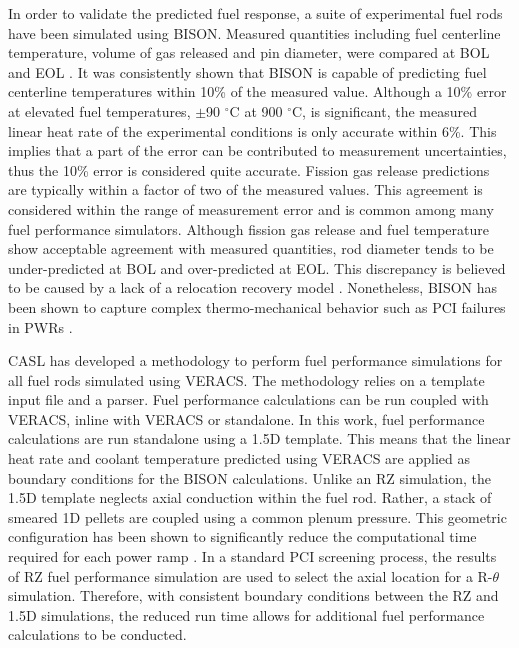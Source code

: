 \documentclass[edeposit,fullpage,11pt]{uiucthesis2009}
\begin{document}
In order to validate the predicted fuel response, a suite of experimental fuel rods have been simulated using BISON.
Measured quantities including fuel centerline temperature, volume of gas released and pin diameter, were compared at \gls{BOL} and \gls{EOL} \cite{williamson_validating_2016}.
It was consistently shown that BISON is capable of predicting fuel centerline temperatures within 10\% of the measured value.
Although a 10\% error at elevated fuel temperatures, $\pm$90 $^\circ$C at 900 $^\circ$C, is significant, the measured linear heat rate of the experimental conditions is only accurate within 6\%. 
This implies that a part of the error can be contributed to measurement uncertainties, thus the 10\% error is considered quite accurate.
Fission gas release predictions are typically within a factor of two of the measured values.
This agreement is considered within the range of measurement error and is common among many fuel performance simulators.
Although fission gas release and fuel temperature show acceptable agreement with measured quantities, rod diameter tends to be under-predicted at \gls{BOL} and over-predicted at \gls{EOL}.
This discrepancy is believed to be caused by a lack of a relocation recovery model \cite{williamson_validating_2016}.
Nonetheless, BISON has been shown to capture complex thermo-mechanical behavior such as PCI failures in PWRs \cite{montgomery_advanced_2014,capps_pci_2017}.

\gls{CASL} has developed a methodology to perform fuel performance simulations for all fuel rods simulated using \gls{VERACS}.
The methodology relies on a template input file and a parser.
Fuel performance calculations can be run coupled with \gls{VERACS}, inline with \gls{VERACS} or standalone.
In this work, fuel performance calculations are run standalone using a 1.5D template.
This means that the linear heat rate and coolant temperature predicted using \gls{VERACS} are applied as boundary conditions for the BISON calculations.
Unlike an RZ simulation, the 1.5D template neglects axial conduction within the fuel rod.
Rather, a stack of smeared 1D pellets are coupled using a common plenum pressure.  
This geometric configuration has been shown to significantly reduce the computational time required for each power ramp \cite{gardner_review_2017}.
In a standard \gls{PCI} screening process, the results of RZ fuel performance simulation are used to select the axial location for a R-$\theta$ simulation.
Therefore, with consistent boundary conditions between the RZ and 1.5D simulations, the reduced run time allows for additional fuel performance calculations to be conducted.
\end{document}
